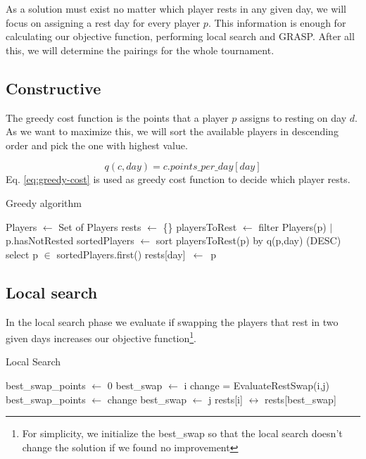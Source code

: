 \documentclass[a4paper, 10pt]{article}
\begin{document}
As a solution must exist no matter which player rests in any given day, we will focus on assigning a rest day for every player $p$. This information is enough for calculating our objective function, performing local search and GRASP. After all this, we will determine the pairings for the whole tournament.

\subsection{Constructive}

The greedy cost function is the points that a player $p$ assigns to resting on day $d$. As we want to maximize this, we will sort the available players in descending order and pick the one with highest value.

\begin{equation}
  \label{eq:greedy-cost}
  q(c,day)= c.points\_per\_day[day]
\end{equation}
Eq. \ref{eq:greedy-cost} is used as greedy cost function to decide which player rests.

\begin{algorithm}
	\caption{Greedy algorithm} 
	\begin{algorithmic}[1]
	  \State Players $\leftarrow$ Set of Players
	  \State rests $\leftarrow$ \{\}
	      \State playersToRest $\leftarrow$ filter Players(p) $|$ p.hasNotRested
        \State sortedPlayers $\leftarrow$ sort playersToRest(p) by q(p,day) (DESC) 
        \State select p $\in$ sortedPlayers.first()
	      \State rests[day]\ $\leftarrow$\ p
	    \EndFor
	\end{algorithmic} 
\end{algorithm}


\subsection{Local search}

In the local search phase we evaluate if swapping the players that rest in two given days increases our objective function\footnote{For simplicity, we initialize the best\_swap so that the local search doesn't change the solution if we found no improvement}.

\begin{algorithm}
	\caption{Local Search} 
	\begin{algorithmic}[1]
    \State best\_swap\_points $\leftarrow$ 0
    \State best\_swap $\leftarrow$ i
        \State change = EvaluateRestSwap(i,j)
          \State best\_swap\_points $\leftarrow$ change
          \State best\_swap $\leftarrow$ j
        \EndIf
      \EndFor
      \State rests[i] $\leftrightarrow$ rests[best\_swap]
		\EndFor
	\end{algorithmic} 
\end{algorithm}
\end{document}
